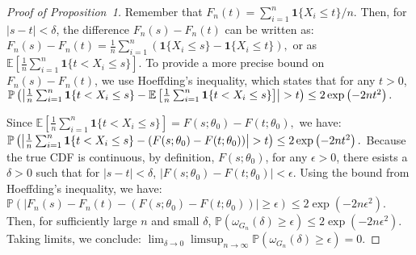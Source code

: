 \documentclass[12pt]{article}
\begin{document}
\begin{proof}[Proof of Proposition~1]
Remember that $F_n(t) = \sum_{i=1}^n  \mathbf{1}\{X_i \le t\} / n$. Then, for 
$ |s - t| < \delta $, the difference $ F_n(s) - F_n(t) $ can be written as:
$ F_n(s) - F_n(t) = \frac{1}{n} \sum_{i=1}^n \left( \mathbf{1}\{X_i \leq s\} - 
\mathbf{1}\{X_i \leq t\} \right), $ or as 
$ \mathbb{E}\left[ \frac{1}{n} \sum_{i=1}^n \mathbf{1}\{ t < X_i \leq s \} 
\right] $. To provide a more precise bound on $ F_n(s) - F_n(t) $, we use 
Hoeffding's inequality, which states that for any $ t > 0 $,
$ \mathbb{P}\left( \left| \frac{1}{n} \sum_{i=1}^n \mathbf{1}\{ t < X_i \leq s 
\} - \\
\mathbb{E}\left[ \frac{1}{n} \sum_{i=1}^n \mathbf{1}\{ t < X_i \leq s \} 
\right] \right| > t \right) \leq 2 \exp\left( -2nt^2 \right). $

Since 
$ \mathbb{E}\left[ \frac{1}{n} \sum_{i=1}^n \mathbf{1}\{ t < X_i \leq s \} 
\right] = F(s; \theta_0) - F(t; \theta_0), $
we have:
$ \mathbb{P}\left( \left| \frac{1}{n} \sum_{i=1}^n \mathbf{1}\{ t < X_i \leq s 
\} - \\
(F(s; \theta_0) - F(t; \theta_0)) \right| > t \right) \leq 2
\exp\left( 
-2nt^2 \right). $
Because the true CDF is continuous, by definition, $ F(s; \theta_0) $, for any $ \epsilon > 0 
$, there esists a $ \delta > 0 $ such that for $ |s - t| < \delta $,
$ |F(s; \theta_0) - F(t; \theta_0)| < \epsilon. $ Using the bound from Hoeffding's inequality, we have:
$ \mathbb{P}\left( |F_n(s) - F_n(t) - (F(s; \theta_0) - F(t; \theta_0))| \geq 
\epsilon \right) \leq 2 \exp\left( -2n\epsilon^2 \right). $ Then, for sufficiently large $ n $ and small $ \delta $,
$ \mathbb{P}\left( \omega_{G_n}(\delta) \geq \epsilon \right) \leq 2 
\exp\left( -2n\epsilon^2 \right). $ Taking limits, we conclude:
$ \lim_{\delta \to 0} \limsup_{n \to \infty} \mathbb{P}\left( 
\omega_{G_n}(\delta) \geq \epsilon \right) = 0. $



\end{proof}
\end{document}
